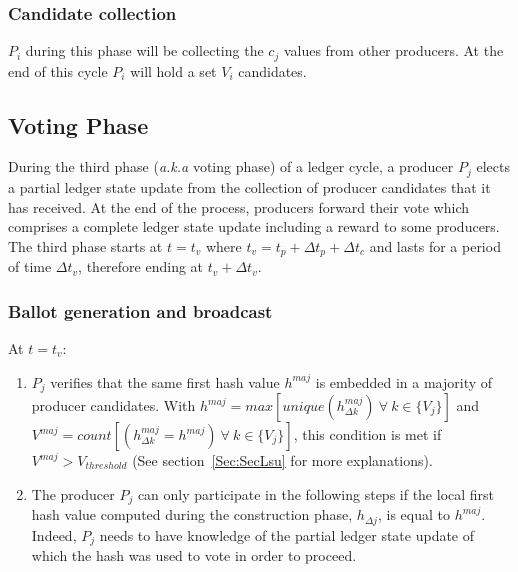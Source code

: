\documentclass{article}
\begin{document}
\subsubsection{Candidate collection}

$P_i$ during this phase will be collecting the $c_j$ values from other producers. At the end of this cycle $P_i$ will hold a set $V_i$ candidates.



\subsection{Voting Phase}

During the third phase (\textit{a.k.a} voting phase) of a ledger cycle, a producer $P_j$ elects a partial ledger state update from the collection of producer candidates that it has received. At the end of the process, producers forward their vote which comprises a complete ledger state update including a reward to some producers. \\

The third phase starts at $t = t_v$ where $t_v = t_p + \Delta t_{p} + \Delta t_{c}$ and lasts for a period of time $\Delta t_{v}$, therefore ending at $t_v+\Delta t_{v}$.


\subsubsection{Ballot generation and broadcast}
At $t = t_v$:
\begin{enumerate}
\item $P_j$ verifies that the same first hash value $h^{maj}$ is embedded in a majority of producer candidates. With $h^{maj} = max[unique(h^{maj}_{\Delta k})~\forall~k\in\{V_j\}]$ and $V^{maj} = count[(h^{maj}_{\Delta k} = h^{maj})~\forall~k\in\{V_j\}]$, this condition is met if $V^{maj} > V_{threshold}$ (See section~\ref{Sec:SecLsu} for more explanations). 
\item The producer $P_j$ can only participate in the following steps if the local first hash value computed during the construction phase, $h_{\Delta j}$, is equal to $h^{maj}$. Indeed, $P_j$ needs to have knowledge of the partial ledger state update of which the hash was used to vote in order to proceed. 
\end{enumerate}
 
\end{document}
